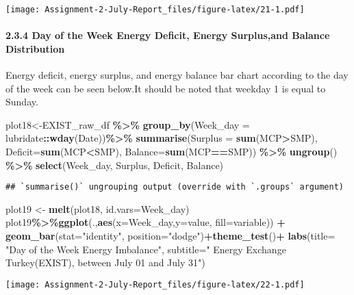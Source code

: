 \documentclass[
]{article}
\newenvironment{Shaded}{\begin{snugshade}}{\end{snugshade}}
\newcommand{\DataTypeTok}[1]{\textcolor[rgb]{0.13,0.29,0.53}{#1}}
\newcommand{\KeywordTok}[1]{\textcolor[rgb]{0.13,0.29,0.53}{\textbf{#1}}}
\newcommand{\NormalTok}[1]{#1}
\newcommand{\OperatorTok}[1]{\textcolor[rgb]{0.81,0.36,0.00}{\textbf{#1}}}
\newcommand{\StringTok}[1]{\textcolor[rgb]{0.31,0.60,0.02}{#1}}
\begin{document}
\texttt{[image: Assignment-2-July-Report\_files/figure-latex/21-1.pdf]}

\hypertarget{day-of-the-week-energy-deficit-energy-surplusand-balance-distribution}{%
\paragraph{2.3.4 Day of the Week Energy Deficit, Energy Surplus,and
Balance
Distribution}\label{day-of-the-week-energy-deficit-energy-surplusand-balance-distribution}}

Energy deficit, energy surplus, and energy balance bar chart according
to the day of the week can be seen below.It should be noted that weekday
1 is equal to Sunday.

\begin{Shaded}
\begin{Highlighting}[]
\NormalTok{plot18\textless{}{-}EXIST\_raw\_df }\OperatorTok{\%\textgreater{}\%}\StringTok{ }\KeywordTok{group\_by}\NormalTok{(}\DataTypeTok{Week\_day =}\NormalTok{ lubridate}\OperatorTok{::}\KeywordTok{wday}\NormalTok{(Date))}\OperatorTok{\%\textgreater{}\%}\StringTok{ }
\StringTok{  }\KeywordTok{summarise}\NormalTok{(}\DataTypeTok{Surplus =} \KeywordTok{sum}\NormalTok{(MCP}\OperatorTok{\textgreater{}}\NormalTok{SMP), }\DataTypeTok{Deficit=}\KeywordTok{sum}\NormalTok{(MCP}\OperatorTok{\textless{}}\NormalTok{SMP), }\DataTypeTok{Balance=}\KeywordTok{sum}\NormalTok{(MCP}\OperatorTok{==}\NormalTok{SMP)) }\OperatorTok{\%\textgreater{}\%}\StringTok{ }\KeywordTok{ungroup}\NormalTok{() }\OperatorTok{\%\textgreater{}\%}
\StringTok{  }\KeywordTok{select}\NormalTok{(Week\_day, Surplus, Deficit, Balance) }
\end{Highlighting}
\end{Shaded}

\begin{verbatim}
## `summarise()` ungrouping output (override with `.groups` argument)
\end{verbatim}

\begin{Shaded}
\begin{Highlighting}[]
\NormalTok{plot19 \textless{}{-}}\StringTok{ }\KeywordTok{melt}\NormalTok{(plot18, }\DataTypeTok{id.vars=}\StringTok{\textquotesingle{}Week\_day\textquotesingle{}}\NormalTok{)}
\NormalTok{plot19}\OperatorTok{\%\textgreater{}\%}\KeywordTok{ggplot}\NormalTok{(.,}\KeywordTok{aes}\NormalTok{(}\DataTypeTok{x=}\NormalTok{Week\_day,}\DataTypeTok{y=}\NormalTok{value, }\DataTypeTok{fill=}\NormalTok{variable)) }\OperatorTok{+}\StringTok{ }\KeywordTok{geom\_bar}\NormalTok{(}\DataTypeTok{stat=}\StringTok{"identity"}\NormalTok{, }\DataTypeTok{position=}\StringTok{"dodge"}\NormalTok{)}\OperatorTok{+}\KeywordTok{theme\_test}\NormalTok{()}\OperatorTok{+}
\StringTok{      }\KeywordTok{labs}\NormalTok{(}\DataTypeTok{title=}  \StringTok{"Day of the Week Energy Imbalance"}\NormalTok{,}
           \DataTypeTok{subtitle=}\StringTok{" Energy Exchange Turkey(EXIST), between July 01 and July 31"}\NormalTok{)}
\end{Highlighting}
\end{Shaded}

\texttt{[image: Assignment-2-July-Report\_files/figure-latex/22-1.pdf]}
\end{document}
